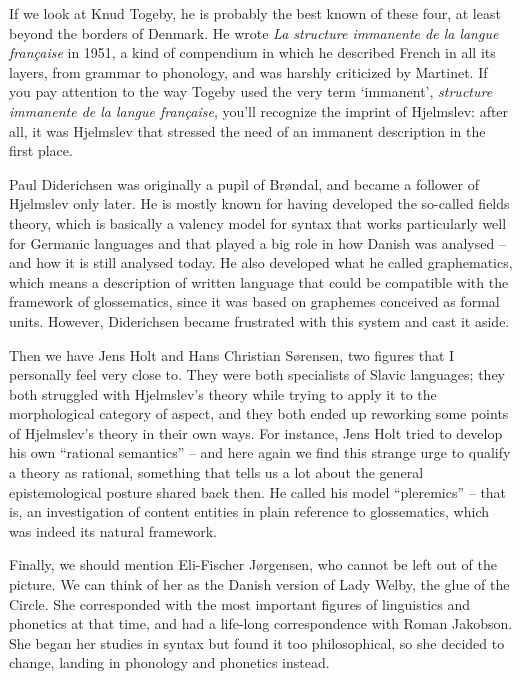 \begin{styleStandard}
If we look at Knud Togeby, he is probably the best known of these four, at least beyond the borders of Denmark. He wrote \textit{La structure immanente de la langue française} in 1951, a kind of compendium in which he described French in all its layers, from grammar to phonology, and was harshly criticized by Martinet. If you pay attention to the way Togeby used the very term ‘immanent’, \textit{structure immanente de la langue française}, you’ll recognize the imprint of Hjelmslev: after all, it was Hjelmslev that stressed the need of an immanent description in the first place.
\end{styleStandard}

\begin{styleStandard}
Paul Diderichsen was originally a pupil of Brøndal, and became a follower of Hjelmslev only later. He is mostly known for having developed the so-called fields theory, which is basically a valency model for syntax that works particularly well for Germanic languages and that played a big role in how Danish was analysed – and how it is still analysed today. He also developed what he called graphematics, which means a description of written language that could be compatible with the framework of glossematics, since it was based on graphemes conceived as formal units. However, Diderichsen became frustrated with this system and cast it aside.
\end{styleStandard}

\begin{styleStandard}
Then we have Jens Holt and Hans Christian Sørensen, two figures that I personally feel very close to. They were both specialists of Slavic languages; they both struggled with Hjelmslev’s theory while trying to apply it to the morphological category of aspect, and they both ended up reworking some points of Hjelmslev’s theory in their own ways. For instance, Jens Holt tried to develop his own “rational semantics” – and here again we find this strange urge to qualify a theory as rational, something that tells us a lot about the general epistemological posture shared back then. He called his model “pleremics” – that is, an investigation of content entities in plain reference to glossematics, which was indeed its natural framework. 
\end{styleStandard}

\begin{styleStandard}
Finally, we should mention Eli-Fischer Jørgensen, who cannot be left out of the picture. We can think of her as the Danish version of Lady Welby, the glue of the Circle. She corresponded with the most important figures of linguistics and phonetics at that time, and had a life-long correspondence with Roman Jakobson. She began her studies in syntax but found it too philosophical, so she decided to change, landing in phonology and phonetics instead. 
\end{styleStandard}

